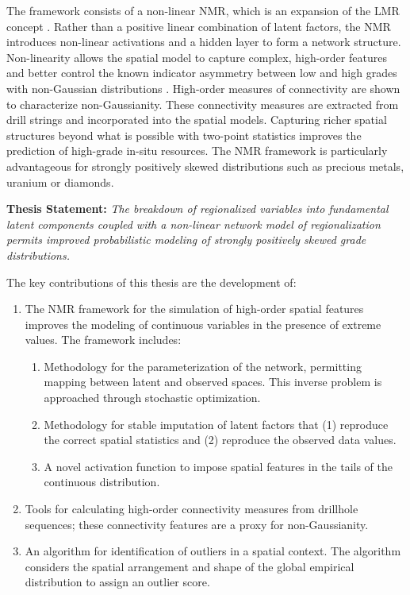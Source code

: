 The framework consists of a non-linear \acrfull{NMR}, which is an expansion of the \acrfull{LMR} concept \citep{journel1974geostatistics}. Rather than a positive linear combination of latent factors, the \gls{NMR} introduces non-linear activations and a hidden layer to form a network structure. Non-linearity allows the spatial model to capture complex, high-order features and better control the known indicator asymmetry between low and high grades with non-Gaussian distributions \citep{journel1989nongaussian}. High-order measures of connectivity are shown to characterize non-Gaussianity. These connectivity measures are extracted from drill strings and incorporated into the spatial models. Capturing richer spatial structures beyond what is possible with two-point statistics improves the prediction of high-grade in-situ resources. The \gls{NMR} framework is particularly advantageous for strongly positively skewed distributions such as precious metals, uranium or diamonds.

\vspace{\baselineskip}
\begin{tcolorbox}[]
    \textbf{Thesis Statement:} \textit{The breakdown of regionalized variables into fundamental latent components coupled with a non-linear network model of regionalization permits improved probabilistic modeling of strongly positively skewed grade distributions.}
\end{tcolorbox}
\vspace{\baselineskip}

The key contributions of this thesis are the development of:
\begin{enumerate}[noitemsep]
    \item The \gls{NMR} framework for the simulation of high-order spatial features improves the modeling of continuous variables in the presence of extreme values. The framework includes:
          \begin{enumerate}[noitemsep]
              \item Methodology for the parameterization of the network, permitting mapping between latent and observed spaces. This inverse problem is approached through stochastic optimization.
              \item Methodology for stable imputation of latent factors that (1) reproduce the correct spatial statistics and (2) reproduce the observed data values.
              \item A novel activation function to impose spatial features in the tails of the continuous distribution.
          \end{enumerate}
    \item Tools for calculating high-order connectivity measures from drillhole sequences; these connectivity features are a proxy for non-Gaussianity.
    \item An algorithm for identification of outliers in a spatial context. The algorithm considers the spatial arrangement and shape of the global empirical distribution to assign an outlier score.
\end{enumerate}

